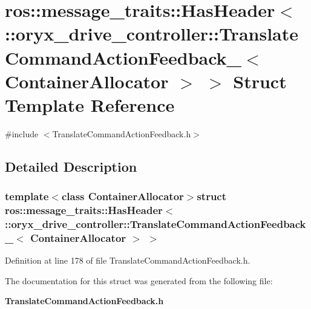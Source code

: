 \section{ros\-:\-:message\-\_\-traits\-:\-:\-Has\-Header$<$ \-:\-:oryx\-\_\-drive\-\_\-controller\-:\-:\-Translate\-Command\-Action\-Feedback\-\_\-$<$ \-Container\-Allocator $>$ $>$ \-Struct \-Template \-Reference}
\label{structros_1_1message__traits_1_1HasHeader_3_01_1_1oryx__drive__controller_1_1TranslateCommandAct6d8c45ee12768c3d6b727a18cfb857ee}


{\ttfamily \#include $<$\-Translate\-Command\-Action\-Feedback.\-h$>$}



\subsection{\-Detailed \-Description}
\subsubsection*{template$<$class Container\-Allocator$>$struct ros\-::message\-\_\-traits\-::\-Has\-Header$<$ \-::oryx\-\_\-drive\-\_\-controller\-::\-Translate\-Command\-Action\-Feedback\-\_\-$<$ Container\-Allocator $>$ $>$}



\-Definition at line 178 of file \-Translate\-Command\-Action\-Feedback.\-h.



\-The documentation for this struct was generated from the following file\-:\begin{DoxyCompactItemize}
\item 
{\bf \-Translate\-Command\-Action\-Feedback.\-h}\end{DoxyCompactItemize}
